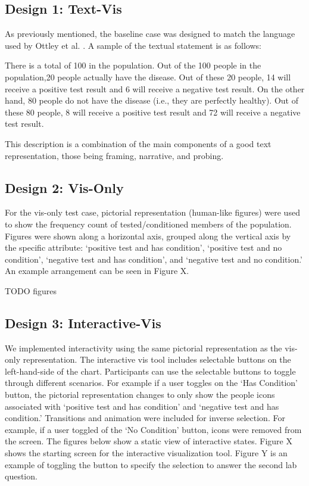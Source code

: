 \subsection{Design 1: Text-Vis}
As previously mentioned, the baseline case was designed to match the language used by Ottley et al. \cite{Ottley2016}. A sample of the textual statement is as follows:

\begin{displayquote}
    There is a total of 100 in the population. Out of the 100 people in the population,20 people actually have the disease. Out of these 20 people, 14 will receive a positive test result and 6 will receive a negative test result. On the other hand, 80 people do not have the disease (i.e., they are perfectly healthy). Out of these 80 people, 8 will receive a positive test result and 72 will receive a negative test result.
\end{displayquote}

This description is a combination of the main components of a good text representation, those being framing, narrative, and probing.

\subsection{Design 2: Vis-Only}
For the vis-only test case, pictorial representation (human-like figures) were used to show the frequency count of tested/conditioned members of the population. Figures were shown along a horizontal axis, grouped along the vertical axis by the specific attribute: ‘positive test and has condition’, ‘positive test and no condition’, ‘negative test and has condition’, and ‘negative test and no condition.’ An example arrangement can be seen in Figure X. 

TODO figures

\subsection{Design 3: Interactive-Vis}
We implemented interactivity using the same pictorial representation as the
vis-only representation. The interactive vis tool includes selectable buttons
on the left-hand-side of the chart. Participants can use the selectable
buttons to toggle through different scenarios. For example if a user toggles
on the ‘Has Condition’ button, the pictorial representation changes to only
show the people icons associated with ‘positive test and has condition’ and
‘negative test and has condition.’ Transitions and animation were included
for inverse selection. For example, if a user toggled of the ‘No Condition’
button, icons were removed from the screen. The figures below show a static
view of interactive states. Figure X shows the starting screen for the
interactive visualization tool. Figure Y is an example of toggling the button
to specify the selection to answer the second lab question.



